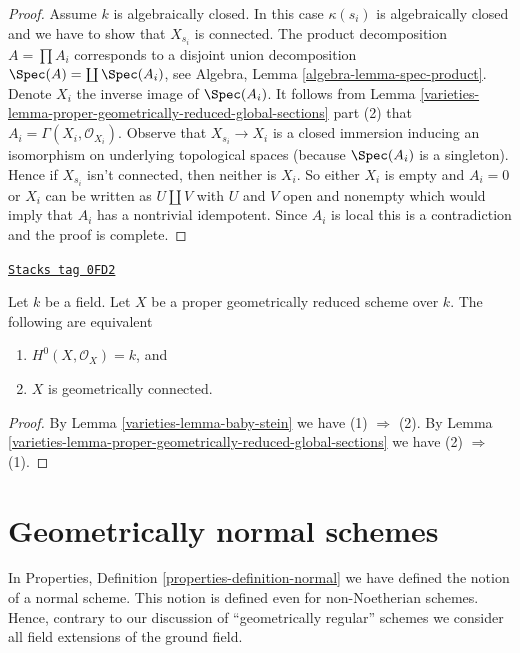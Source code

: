 \begin{proof}
\medskip\noindent
Assume $k$ is algebraically closed. In this case $\kappa(s_i)$
is algebraically closed and we have to show that $X_{s_i}$
is connected. The product decomposition
$A = \prod A_i$ corresponds to a disjoint union decomposition
$\Spec(A) = \coprod \Spec(A_i)$, see
Algebra, Lemma \ref{algebra-lemma-spec-product}.
Denote $X_i$ the inverse image of $\Spec(A_i)$.
It follows from
Lemma \ref{varieties-lemma-proper-geometrically-reduced-global-sections} part (2) that
$A_i = \Gamma(X_i, \mathcal{O}_{X_i})$.
Observe that $X_{s_i} \to X_i$ is a closed immersion inducing
an isomorphism on underlying topological spaces (because $\Spec(A_i)$
is a singleton). Hence if $X_{s_i}$ isn't connected, then neither is
$X_i$. So either $X_i$ is empty and $A_i = 0$ or $X_i$ can be written
as $U \amalg V$ with $U$ and $V$ open and nonempty which would
imply that $A_i$ has a nontrivial idempotent. Since $A_i$ is
local this is a contradiction and the proof is complete.
\end{proof}

\begin{lemma}
\label{varieties-lemma-geometrically-reduced-stein}
\href{https://stacks.math.columbia.edu/tag/0FD2}{\texttt{Stacks tag 0FD2}}

Let $k$ be a field. Let $X$ be a proper geometrically reduced scheme over $k$.
The following are equivalent
\begin{enumerate}
\item $H^0(X, \mathcal{O}_X) = k$, and
\item $X$ is geometrically connected.
\end{enumerate}
\end{lemma}

\begin{proof}

By Lemma \ref{varieties-lemma-baby-stein} we have (1) $\Rightarrow$ (2).
By Lemma \ref{varieties-lemma-proper-geometrically-reduced-global-sections}
we have (2) $\Rightarrow$ (1).
\end{proof}

\section{Geometrically normal schemes}
\label{varieties-section-geometrically-normal}
In Properties, Definition \ref{properties-definition-normal}
we have defined the notion of a normal scheme.
This notion is defined even for non-Noetherian
schemes. Hence, contrary to our discussion of
``geometrically regular'' schemes we consider all
field extensions of the ground field.

